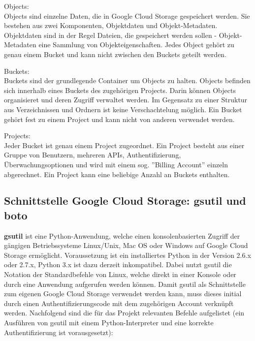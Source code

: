\documentclass[12pt,a4paper,bibliography=totocnumbered,listof=totocnumbered]{scrartcl}
\begin{document}
\begin{compactitem}
	\item Objects:\\
	Objects sind einzelne Daten, die in Google Cloud Storage gespeichert werden. Sie bestehen aus zwei Komponenten, Objektdaten und Objekt-Metadaten. Objektdaten sind in der Regel Dateien, die gespeichert werden sollen - Objekt-Metadaten eine Sammlung von Objekteigenschaften. Jedes Object gehört zu genau einem Bucket und kann nicht zwischen den Buckets geteilt werden. 
		\item Buckets:\\
	Buckets sind der grundlegende Container um Objects zu halten. Objects befinden sich innerhalb eines Buckets des zugehörigen Projects. Darin können Objects organisieret und deren Zugriff verwaltet werden. Im Gegensatz zu einer Struktur aus Verzeichnissen und Ordnern ist keine Verschachtelung möglich. Ein Bucket gehört fest zu einem Project und kann nicht von anderen verwendet werden.
	\item Projects:\\
 Jeder Bucket ist genau einem Project zugeordnet. Ein Project besteht aus einer Gruppe von Benutzern, mehreren APIs, Authentifizierung, Überwachungsoptionen und wird mit einem sog. ''Billing Account'' einzeln abgerechnet. Ein Project kann eine beliebige Anzahl an Buckets enthalten.
\end{compactitem}

\subsection{Schnittstelle Google Cloud Storage: gsutil und boto}\label{GsutilV}
\textbf{gsutil} \cite{32} ist eine Python-Anwendung, welche einen konsolenbasierten Zugriff der gängigen Betriebssysteme Linux/Unix, Mac OS oder Windows auf Google Cloud Storage ermöglicht. Voraussetzung ist ein installiertes Python in der Version 2.6.x oder 2.7.x,  Python 3.x ist dazu derzeit inkompatibel. Dabei nutzt gsutil die Notation der Standardbefehle von Linux, welche direkt in einer Konsole oder durch eine Anwendung aufgerufen werden können. Damit gsutil als Schnittstelle zum eigenen Google Cloud Storage verwendet werden kann, muss dieses initial durch einen Authentifizierungscode mit dem zugehörigen Account verknüpft werden. Nachfolgend sind die für das Projekt relevanten Befehle aufgelistet (ein Ausführen von gsutil mit einem Python-Interpreter und eine korrekte Authentifizierung ist vorausgesetzt):
\end{document}
